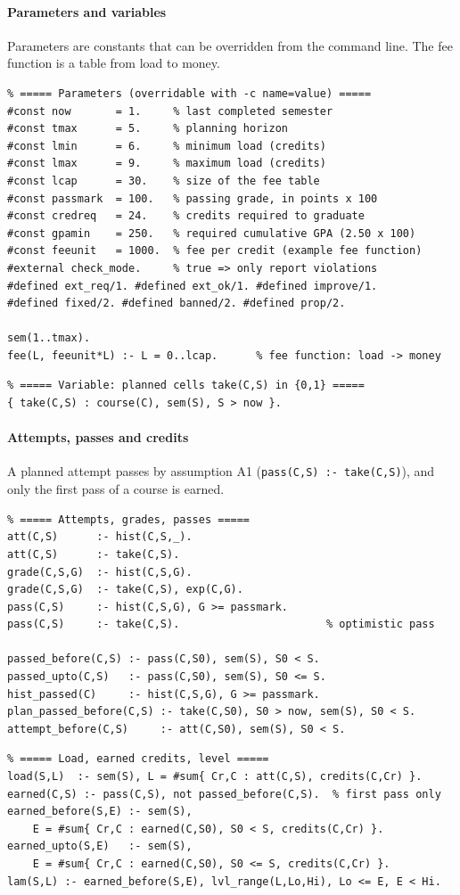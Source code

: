 \paragraph{Parameters and variables}
Parameters are constants that can be overridden from the command line.
The fee function is a table from load to money.
\begin{lstlisting}
% ===== Parameters (overridable with -c name=value) =====
#const now       = 1.     % last completed semester
#const tmax      = 5.     % planning horizon
#const lmin      = 6.     % minimum load (credits)
#const lmax      = 9.     % maximum load (credits)
#const lcap      = 30.    % size of the fee table
#const passmark  = 100.   % passing grade, in points x 100
#const credreq   = 24.    % credits required to graduate
#const gpamin    = 250.   % required cumulative GPA (2.50 x 100)
#const feeunit   = 1000.  % fee per credit (example fee function)
#external check_mode.     % true => only report violations
#defined ext_req/1. #defined ext_ok/1. #defined improve/1.
#defined fixed/2. #defined banned/2. #defined prop/2.
 
sem(1..tmax).
fee(L, feeunit*L) :- L = 0..lcap.      % fee function: load -> money
\end{lstlisting}
\begin{lstlisting}
% ===== Variable: planned cells take(C,S) in {0,1} =====
{ take(C,S) : course(C), sem(S), S > now }.
\end{lstlisting}
 
\paragraph{Attempts, passes and credits}
A planned attempt passes by assumption A1 (\texttt{pass(C,S) :- take(C,S)}),
and only the first pass of a course is earned.
\begin{lstlisting}
% ===== Attempts, grades, passes =====
att(C,S)      :- hist(C,S,_).
att(C,S)      :- take(C,S).
grade(C,S,G)  :- hist(C,S,G).
grade(C,S,G)  :- take(C,S), exp(C,G).
pass(C,S)     :- hist(C,S,G), G >= passmark.
pass(C,S)     :- take(C,S).                       % optimistic pass
 
passed_before(C,S) :- pass(C,S0), sem(S), S0 < S.
passed_upto(C,S)   :- pass(C,S0), sem(S), S0 <= S.
hist_passed(C)     :- hist(C,S,G), G >= passmark.
plan_passed_before(C,S) :- take(C,S0), S0 > now, sem(S), S0 < S.
attempt_before(C,S)     :- att(C,S0), sem(S), S0 < S.
\end{lstlisting}
\begin{lstlisting}
% ===== Load, earned credits, level =====
load(S,L)  :- sem(S), L = #sum{ Cr,C : att(C,S), credits(C,Cr) }.
earned(C,S) :- pass(C,S), not passed_before(C,S).  % first pass only
earned_before(S,E) :- sem(S),
    E = #sum{ Cr,C : earned(C,S0), S0 < S, credits(C,Cr) }.
earned_upto(S,E)   :- sem(S),
    E = #sum{ Cr,C : earned(C,S0), S0 <= S, credits(C,Cr) }.
lam(S,L) :- earned_before(S,E), lvl_range(L,Lo,Hi), Lo <= E, E < Hi.
\end{lstlisting}
 
